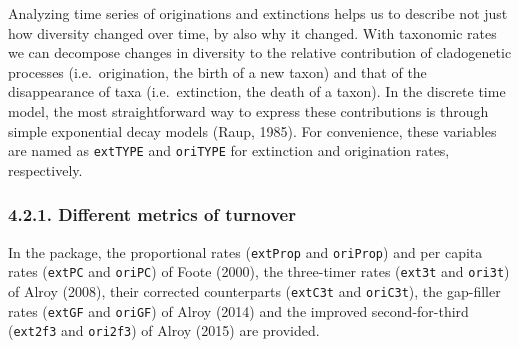 \documentclass[]{article}
\newenvironment{Shaded}{\begin{snugshade}}{\end{snugshade}}
\newcommand{\KeywordTok}[1]{\textcolor[rgb]{0.13,0.29,0.53}{\textbf{{#1}}}}
\newcommand{\DataTypeTok}[1]{\textcolor[rgb]{0.13,0.29,0.53}{{#1}}}
\newcommand{\DecValTok}[1]{\textcolor[rgb]{0.00,0.00,0.81}{{#1}}}
\newcommand{\StringTok}[1]{\textcolor[rgb]{0.31,0.60,0.02}{{#1}}}
\newcommand{\CommentTok}[1]{\textcolor[rgb]{0.56,0.35,0.01}{\textit{{#1}}}}
\newcommand{\NormalTok}[1]{{#1}}
\begin{document}
Analyzing time series of originations and extinctions helps us to
describe not just how diversity changed over time, by also why it
changed. With taxonomic rates we can decompose changes in diversity to
the relative contribution of cladogenetic processes (i.e.~origination,
the birth of a new taxon) and that of the disappearance of taxa
(i.e.~extinction, the death of a taxon). In the discrete time model, the
most straightforward way to express these contributions is through
simple exponential decay models (Raup, 1985). For convenience, these
variables are named as \texttt{extTYPE} and \texttt{oriTYPE} for
extinction and origination rates, respectively.

\subsubsection{4.2.1. Different metrics of
turnover}\label{different-metrics-of-turnover}

In the package, the proportional rates (\texttt{extProp} and
\texttt{oriProp}) and per capita rates (\texttt{extPC} and
\texttt{oriPC}) of Foote (2000), the three-timer rates (\texttt{ext3t}
and \texttt{ori3t}) of Alroy (2008), their corrected counterparts
(\texttt{extC3t} and \texttt{oriC3t}), the gap-filler rates
(\texttt{extGF} and \texttt{oriGF}) of Alroy (2014) and the improved
second-for-third (\texttt{ext2f3} and \texttt{ori2f3}) of Alroy (2015)
are provided.

\begin{Shaded}
\end{Shaded}
\end{document}
